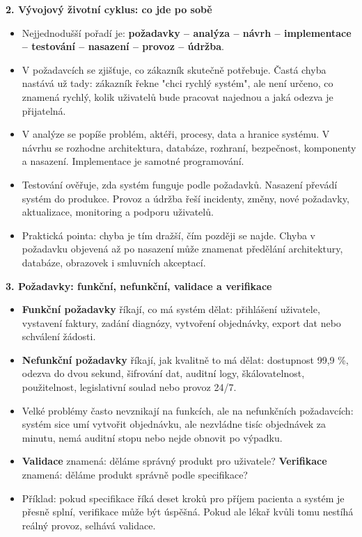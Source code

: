 \documentclass[11pt,a4paper]{article}
\begin{document}
\textbf{2. Vývojový životní cyklus: co jde po sobě}
\begin{itemize}
  \item Nejjednodušší pořadí je: \textbf{požadavky -- analýza -- návrh -- implementace -- testování -- nasazení -- provoz -- údržba}.
  \item V požadavcích se zjišťuje, co zákazník skutečně potřebuje. Častá chyba nastává už tady: zákazník řekne "chci rychlý systém", ale není určeno, co znamená rychlý, kolik uživatelů bude pracovat najednou a jaká odezva je přijatelná.
  \item V analýze se popíše problém, aktéři, procesy, data a hranice systému. V návrhu se rozhodne architektura, databáze, rozhraní, bezpečnost, komponenty a nasazení. Implementace je samotné programování.
  \item Testování ověřuje, zda systém funguje podle požadavků. Nasazení převádí systém do produkce. Provoz a údržba řeší incidenty, změny, nové požadavky, aktualizace, monitoring a podporu uživatelů.
  \item Praktická pointa: chyba je tím dražší, čím později se najde. Chyba v požadavku objevená až po nasazení může znamenat předělání architektury, databáze, obrazovek i smluvních akceptací.
\end{itemize}

\textbf{3. Požadavky: funkční, nefunkční, validace a verifikace}
\begin{itemize}
  \item \textbf{Funkční požadavky} říkají, co má systém dělat: přihlášení uživatele, vystavení faktury, zadání diagnózy, vytvoření objednávky, export dat nebo schválení žádosti.
  \item \textbf{Nefunkční požadavky} říkají, jak kvalitně to má dělat: dostupnost 99,9 \%, odezva do dvou sekund, šifrování dat, auditní logy, škálovatelnost, použitelnost, legislativní soulad nebo provoz 24/7.
  \item Velké problémy často nevznikají na funkcích, ale na nefunkčních požadavcích: systém sice umí vytvořit objednávku, ale nezvládne tisíc objednávek za minutu, nemá auditní stopu nebo nejde obnovit po výpadku.
  \item \textbf{Validace} znamená: děláme správný produkt pro uživatele? \textbf{Verifikace} znamená: děláme produkt správně podle specifikace?
  \item Příklad: pokud specifikace říká deset kroků pro příjem pacienta a systém je přesně splní, verifikace může být úspěšná. Pokud ale lékař kvůli tomu nestíhá reálný provoz, selhává validace.
\end{itemize}
\end{document}
